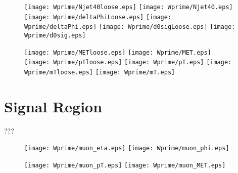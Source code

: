 \begin{figure}[!htb]
  \centering
  \texttt{[image: Wprime/Njet40loose.eps]}
  \texttt{[image: Wprime/Njet40.eps]}
  \texttt{[image: Wprime/deltaPhiLoose.eps]}
  \texttt{[image: Wprime/deltaPhi.eps]}
  \texttt{[image: Wprime/d0sigLoose.eps]}
  \texttt{[image: Wprime/d0sig.eps]}
  \caption{
}
  \label{fig:muMMval1}
\end{figure}
\begin{figure}[!htb]
  \centering
  \texttt{[image: Wprime/METloose.eps]}
  \texttt{[image: Wprime/MET.eps]}
  \texttt{[image: Wprime/pTloose.eps]}
  \texttt{[image: Wprime/pT.eps]}
  \texttt{[image: Wprime/mTloose.eps]}
  \texttt{[image: Wprime/mT.eps]}
  \caption{
}
  \label{fig:muMMval2}
\end{figure}


\section{Signal Region}
\label{sec:wprimeSignalRegion}
???

\begin{figure}[]
  \centering
  \texttt{[image: Wprime/muon\_eta.eps]}
  \texttt{[image: Wprime/muon\_phi.eps]}
  \caption{
}
  \label{fig:mu_results_etaphi}
\end{figure}

\begin{figure}[]
  \centering
  \texttt{[image: Wprime/muon\_pT.eps]}
  \texttt{[image: Wprime/muon\_MET.eps]}
 \caption{
}
  \label{fig:mu_results_ptmet}
\end{figure}


